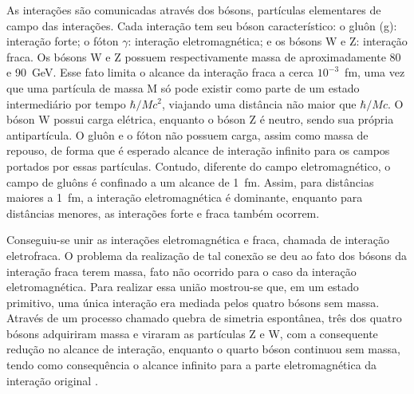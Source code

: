 As interações são comunicadas através dos bósons, partículas elementares
de campo das interações. Cada interação tem seu
bóson característico: o gluôn (g): interação forte; o fóton $\gamma$: interação 
eletromagnética; e os bósons W e Z: interação fraca.  
Os bósons W e Z possuem respectivamente massa de aproximadamente
80 e 90~GeV. Esse fato limita o alcance da interação fraca a cerca $10^{-3}$~fm,
uma vez que uma partícula de massa M só pode existir como parte de um estado
intermediário por tempo $\hbar/Mc^2$, viajando uma distância não maior que
$\hbar/Mc$. O bóson W possui carga elétrica, enquanto o bóson Z é neutro, sendo sua própria antipartícula.
O gluôn e o fóton não possuem carga, assim como massa de repouso, de forma que é esperado alcance de
interação infinito para os campos portados por essas partículas. 
Contudo, diferente do campo eletromagnético, o campo de
gluôns é confinado a um alcance de 1~fm. 
Assim, para distâncias maiores a 1~fm, a interação eletromagnética é dominante,
enquanto para distâncias menores, as interações forte e fraca também ocorrem.

\begin{table}
\centering
{}
\caption[As quatro interações fundamentais]{As quatro interações fundamentais. A intensidade relativa se dá em
relação a interação forte. Adaptado de \cite{Beiser}.}
\label{tab:interacoes}
\end{table}

Conseguiu-se unir as interações eletromagnética e fraca, chamada de interação
eletrofraca. O problema da realização de tal conexão se deu ao fato dos
bósons da interação fraca terem massa, fato não ocorrido para o caso da
interação eletromagnética. Para realizar essa união mostrou-se que, em um
estado primitivo, uma única interação era mediada pelos quatro bósons sem massa.
Através de um processo chamado quebra de simetria espontânea, três dos quatro
bósons adquiriram massa e viraram as partículas Z e W, com a consequente
redução no alcance de interação, enquanto o quarto bóson continuou sem massa,
tendo como consequência o alcance infinito para a parte eletromagnética da
interação original \cite{Beiser}.

